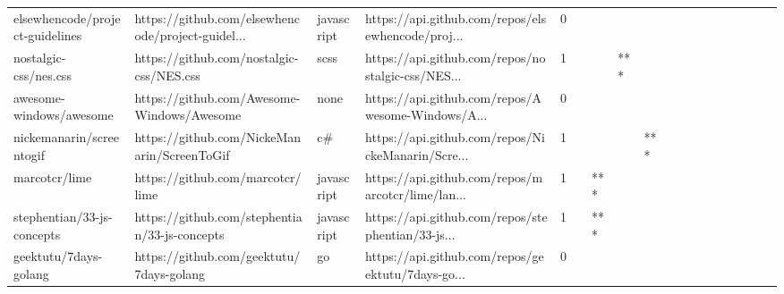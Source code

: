 \begin{tabular}{llllrlllllllllllll}
elsewhencode/project-guidelines                    &  https://github.com/elsewhencode/project-guidel... &        javascript &  https://api.github.com/repos/elsewhencode/proj... &       0 &         &        &           &                &                 &        &           &           &          &          &       &              &          \\
nostalgic-css/nes.css                              &           https://github.com/nostalgic-css/NES.css &              scss &  https://api.github.com/repos/nostalgic-css/NES... &       1 &         &        &       *** &                &                 &        &           &           &          &          &       &              &          \\
awesome-windows/awesome                            &         https://github.com/Awesome-Windows/Awesome &              none &  https://api.github.com/repos/Awesome-Windows/A... &       0 &         &        &           &                &                 &        &           &           &          &          &       &              &          \\
nickemanarin/screentogif                           &        https://github.com/NickeManarin/ScreenToGif &                c\# &  https://api.github.com/repos/NickeManarin/Scre... &       1 &         &        &           &            *** &                 &        &           &           &          &          &       &              &          \\
marcotcr/lime                                      &                   https://github.com/marcotcr/lime &        javascript &  https://api.github.com/repos/marcotcr/lime/lan... &       1 &         &    *** &           &                &                 &        &           &           &          &          &       &              &          \\
stephentian/33-js-concepts                         &      https://github.com/stephentian/33-js-concepts &        javascript &  https://api.github.com/repos/stephentian/33-js... &       1 &         &    *** &           &                &                 &        &           &           &          &          &       &              &          \\
geektutu/7days-golang                              &           https://github.com/geektutu/7days-golang &                go &  https://api.github.com/repos/geektutu/7days-go... &       0 &         &        &           &                &                 &        &           &           &          &          &       &              &          \\

\end{tabular}
